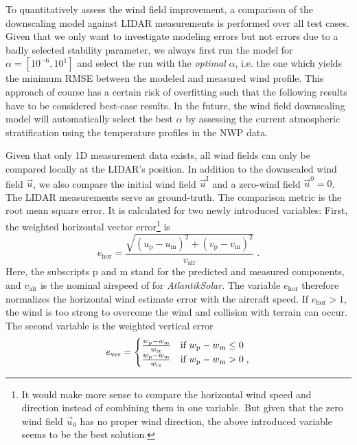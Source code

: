 \documentclass[twocolumn,letterpaper]{IEEEAerospaceCLS}
\begin{document}
To quantitatively assess the wind field improvement, a comparison of the downscaling model against LIDAR measurements is performed over all test cases. Given that we only want to investigate modeling errors but not errors due to a badly selected stability parameter, we always first run the model for $\alpha = [10^{-6},10^1]$ and select the run with the \emph{optimal} $\alpha$, i.e. the one which yields the minimum \ac{RMSE} between the modeled and measured wind profile. This approach of course has a certain risk of overfitting such that the following results have to be considered best-case results. In the future, the wind field downscaling model will automatically select the best $\alpha$ by assessing the current atmospheric stratification using the temperature profiles in the \ac{NWP} data.

Given that only 1D measurement data exists, all wind fields can only be compared locally at the LIDAR's position. In addition to the downscaled wind field $\vec{u}$, we also compare the initial wind field $\vec{u}^\text{I}$ and a zero-wind field $\vec{u}^0=0$. The LIDAR measurements serve as ground-truth. The comparison metric is the root mean square error. It is calculated for two newly introduced variables: First, the weighted horizontal vector error\footnote{It would make more sense to compare the horizontal wind speed and direction instead of combining them in one variable. But given that the zero wind field $\vec{u}_0$ has no proper wind direction, the above introduced variable seems to be the best solution.} is
	\begin{equation}
	e_\text{hor} = \frac{\sqrt{(u_\text{p} - u_\text{m})^2 + (v_\text{p} - v_\text{m})^2}}{v_\text{air}} \; . 
	\end{equation}
Here, the subscripts $\text{p}$ and $\text{m}$ stand for the predicted and measured components, and $v_\text{air}$ is the nominal airspeed of  for \emph{AtlantikSolar}. The variable $e_\text{hor}$ therefore normalizes the horizontal wind estimate error with the aircraft speed. If $e_\text{hor}>1$, the wind is too strong to overcome the wind and collision with terrain can occur. The second variable is the weighted vertical error
	\begin{align}
	e_\text{ver} = \begin{cases} \frac{w_\text{p} - w_\text{m}}{w_\text{sr}} & \textnormal{if } w_\text{p} - w_\text{m} \leq 0 \\ \frac{w_\text{p} - w_\text{m}}{w_\text{cr}} & \textnormal{if } w_\text{p} - w_\text{m} > 0 \; , \end{cases}
	\end{align}
\end{document}
